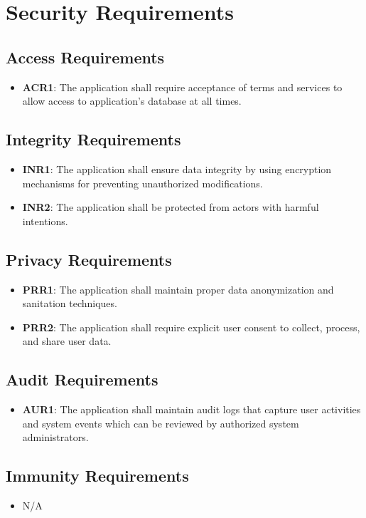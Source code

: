 \documentclass[12pt]{article}
\begin{document}
\section{Security Requirements}
\subsection{Access Requirements}
\begin{itemize}
    \item \textbf{ACR1}: The application shall require acceptance of terms and services to allow access to application's database at all times. 
\end{itemize}
\subsection{Integrity Requirements}
\begin{itemize}
    \item \textbf{INR1}: The application shall ensure data integrity by using encryption mechanisms for preventing unauthorized modifications.
    \item \textbf{INR2}: The application shall be protected from actors with harmful intentions.
\end{itemize}
\subsection{Privacy Requirements}
\begin{itemize}
    \item \textbf{PRR1}: The application shall maintain  proper data anonymization and sanitation techniques.
    \item \textbf{PRR2}: The application shall require explicit user consent to collect, process, and share user data.
\end{itemize}
\subsection{Audit Requirements}
\begin{itemize}
    \item \textbf{AUR1}: The application shall maintain audit logs that capture user activities and system events which can be reviewed by authorized system administrators.
\end{itemize}
\subsection{Immunity Requirements}
\begin{itemize}
    \item N/A
\end{itemize}
\end{document}
